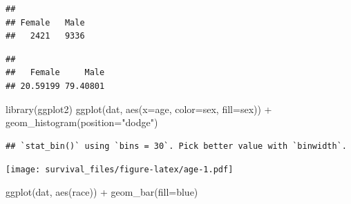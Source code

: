 \documentclass[
]{article}
\newenvironment{Shaded}{\begin{snugshade}}{\end{snugshade}}
\newcommand{\AttributeTok}[1]{\textcolor[rgb]{0.77,0.63,0.00}{#1}}
\newcommand{\DecValTok}[1]{\textcolor[rgb]{0.00,0.00,0.81}{#1}}
\newcommand{\FunctionTok}[1]{\textcolor[rgb]{0.00,0.00,0.00}{#1}}
\newcommand{\NormalTok}[1]{#1}
\newcommand{\SpecialCharTok}[1]{\textcolor[rgb]{0.00,0.00,0.00}{#1}}
\newcommand{\StringTok}[1]{\textcolor[rgb]{0.31,0.60,0.02}{#1}}
\begin{document}
\begin{Shaded}
\end{Shaded}

\begin{verbatim}
## 
## Female   Male 
##   2421   9336
\end{verbatim}

\begin{Shaded}
\end{Shaded}

\begin{verbatim}
## 
##   Female     Male 
## 20.59199 79.40801
\end{verbatim}

\begin{Shaded}
\begin{Highlighting}[]
\FunctionTok{library}\NormalTok{(ggplot2)}
\FunctionTok{ggplot}\NormalTok{(dat, }\FunctionTok{aes}\NormalTok{(}\AttributeTok{x=}\NormalTok{age, }\AttributeTok{color=}\NormalTok{sex, }\AttributeTok{fill=}\NormalTok{sex)) }\SpecialCharTok{+}
  \FunctionTok{geom\_histogram}\NormalTok{(}\AttributeTok{position=}\StringTok{"dodge"}\NormalTok{)}
\end{Highlighting}
\end{Shaded}

\begin{verbatim}
## `stat_bin()` using `bins = 30`. Pick better value with `binwidth`.
\end{verbatim}

\texttt{[image: survival\_files/figure-latex/age-1.pdf]}

\begin{Shaded}
\begin{Highlighting}[]
\FunctionTok{ggplot}\NormalTok{(dat, }\FunctionTok{aes}\NormalTok{(race)) }\SpecialCharTok{+}
  \FunctionTok{geom\_bar}\NormalTok{(}\AttributeTok{fill=}\StringTok{\textquotesingle{}blue\textquotesingle{}}\NormalTok{)}
\end{Highlighting}
\end{Shaded}
\end{document}
